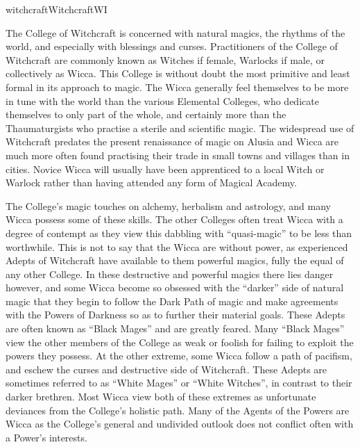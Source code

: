 \begin{college}[1.1]{witchcraft}{Witchcraft}{WI}

The College of Witchcraft is concerned with natural magics, the
rhythms of the world, and especially with blessings and curses.
Practitioners of the College of Witchcraft are commonly known as Witches
if female, Warlocks if male, or collectively as Wicca.  This College
is without doubt the most primitive and least formal in its approach
to magic.  The Wicca generally feel themselves to be more in tune with
the world than the various Elemental Colleges, who dedicate themselves
to only part of the whole, and certainly more than the Thaumaturgists
who practise a sterile and scientific magic.  The widespread use of
Witchcraft predates the present renaissance of magic on Alusia and
Wicca are much more often found practising their trade in small towns
and villages than in cities.  Novice Wicca will usually have been
apprenticed to a local Witch or Warlock rather than having attended
any form of Magical Academy.

The College's magic touches on alchemy, herbalism and astrology, and
many Wicca possess some of these skills.  The other Colleges often
treat Wicca with a degree of contempt as they view this dabbling with
``quasi-magic'' to be less than worthwhile.  This is not to say that
the Wicca are without power, as experienced Adepts of Witchcraft have
available to them powerful magics, fully the equal of any other
College.  In these destructive and powerful magics there lies danger
however, and some Wicca become so obsessed with the ``darker'' side of
natural magic that they begin to follow the Dark Path of magic and
make agreements with the Powers of Darkness so as to further their
material goals.  These Adepts are often known as ``Black Mages'' and
are greatly feared.  Many ``Black Mages'' view the other members of
the College as weak or foolish for failing to exploit the powers they
possess.  At the other extreme, some Wicca follow a path of
pacifism, and eschew the curses and destructive side of Witchcraft.
These Adepts are sometimes referred to as ``White Mages'' or ``White
Witches'', in contrast to their darker brethren.  Most Wicca view both
of these extremes as unfortunate deviances from the College's holistic
path.  Many of the Agents of the Powers are Wicca as the College's
general and undivided outlook does not conflict often with a Power's
interests.


\end{college}
